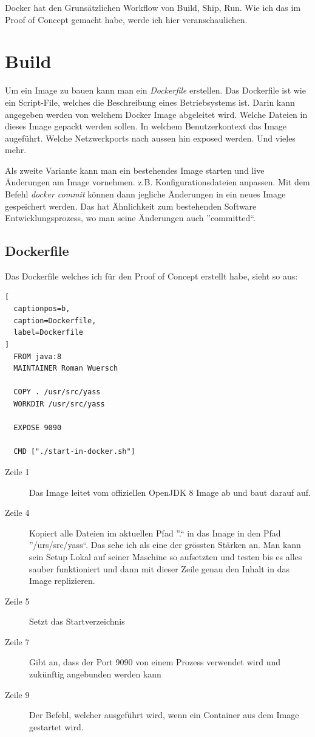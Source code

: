 Docker hat den Grunsätzlichen Workflow von Build, Ship, Run. Wie ich das im Proof of Concept
gemacht habe, werde ich hier veranschaulichen.

\section{Build}

Um ein Image zu bauen kann man ein \textit{Dockerfile} erstellen. Das Dockerfile ist wie ein
Script-File, welches die Beschreibung eines Betriebsystems ist. Darin kann angegeben werden
von welchem Docker Image abgeleitet wird. Welche Dateien in dieses Image gepackt werden sollen.
In welchem Benutzerkontext das Image augeführt. Welche Netzwerkports nach aussen hin exposed werden.
Und vieles mehr.

Als zweite Variante kann man ein bestehendes Image starten und live Änderungen am Image vornehmen.
z.B. Konfigurationsdateien anpassen. Mit dem Befehl \textit{docker commit} können dann jegliche
Änderungen in ein neues Image gespeichert werden. Das hat Ähnlichkeit zum bestehenden
Software Entwicklungsprozess, wo man seine Änderungen auch ”committed“.

\subsection{Dockerfile}

Das Dockerfile welches ich für den Proof of Concept erstellt habe, sieht so aus:

\begin{lstlisting}[
  captionpos=b,
  caption=Dockerfile,
  label=Dockerfile
]
  FROM java:8
  MAINTAINER Roman Wuersch

  COPY . /usr/src/yass
  WORKDIR /usr/src/yass

  EXPOSE 9090

  CMD ["./start-in-docker.sh"]
\end{lstlisting}

\begin{description}

\item[Zeile 1] Das Image leitet vom offiziellen OpenJDK 8 Image ab und baut darauf auf.

\item[Zeile 4] Kopiert alle Dateien im aktuellen Pfad ”.“ in das Image in den Pfad ”/urs/src/yass“. Das
sehe ich als eine der grössten Stärken an. Man kann sein Setup Lokal auf seiner Maschine so aufsetzten und testen
bis es alles sauber funktioniert und dann mit dieser Zeile genau den Inhalt in das Image replizieren.

\item[Zeile 5] Setzt das Startverzeichnis

\item[Zeile 7] Gibt an, dass der Port 9090 von einem Prozess verwendet wird und zukünftig angebunden werden kann

\item[Zeile 9] Der Befehl, welcher ausgeführt wird, wenn ein Container aus dem Image gestartet wird.

\end{description}

